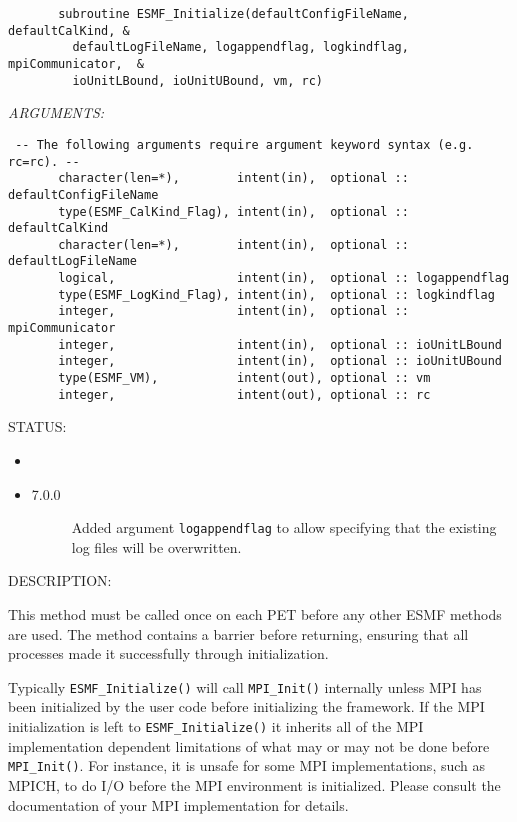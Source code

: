   
\begin{verbatim}       subroutine ESMF_Initialize(defaultConfigFileName, defaultCalKind, &
         defaultLogFileName, logappendflag, logkindflag, mpiCommunicator,  &
         ioUnitLBound, ioUnitUBound, vm, rc)\end{verbatim}{\em ARGUMENTS:}
\begin{verbatim} -- The following arguments require argument keyword syntax (e.g. rc=rc). --
       character(len=*),        intent(in),  optional :: defaultConfigFileName
       type(ESMF_CalKind_Flag), intent(in),  optional :: defaultCalKind
       character(len=*),        intent(in),  optional :: defaultLogFileName
       logical,                 intent(in),  optional :: logappendflag
       type(ESMF_LogKind_Flag), intent(in),  optional :: logkindflag
       integer,                 intent(in),  optional :: mpiCommunicator
       integer,                 intent(in),  optional :: ioUnitLBound
       integer,                 intent(in),  optional :: ioUnitUBound
       type(ESMF_VM),           intent(out), optional :: vm
       integer,                 intent(out), optional :: rc
 \end{verbatim}
{\sf STATUS:}
   \begin{itemize}
   \item{}
   \item{}
   \begin{description}
   \item[7.0.0] Added argument {\tt logappendflag} to allow specifying that the existing
                log files will be overwritten.\newline
   \end{description}
   \end{itemize}
  
{\sf DESCRIPTION:\\ }


       This method must be called once on each PET before
       any other ESMF methods are used.  The method contains a
       barrier before returning, ensuring that all processes
       made it successfully through initialization.
  
       Typically {\tt ESMF\_Initialize()} will call {\tt MPI\_Init()} 
       internally unless MPI has been initialized by the user code before
       initializing the framework. If the MPI initialization is left to
       {\tt ESMF\_Initialize()} it inherits all of the MPI implementation 
       dependent limitations of what may or may not be done before 
       {\tt MPI\_Init()}. For instance, it is unsafe for some MPI
       implementations, such as MPICH, to do I/O before the MPI environment
       is initialized. Please consult the documentation of your MPI
       implementation for details.
  
